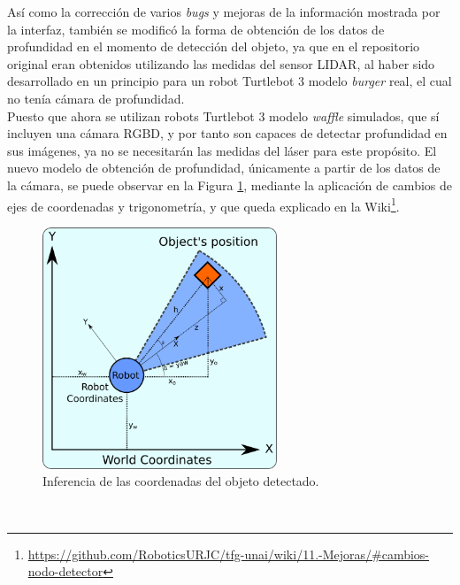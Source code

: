 Así como la corrección de varios \textit{bugs} y mejoras de la información
mostrada por la interfaz, también se modificó la forma de obtención de los datos
de profundidad en el momento de detección del objeto, ya que en el repositorio
original eran obtenidos utilizando las medidas del sensor LIDAR, al haber sido
desarrollado en un principio para un robot Turtlebot 3 modelo \textit{burger}
real, el cual no tenía cámara de profundidad.
\\

Puesto que ahora se utilizan robots Turtlebot 3 modelo \textit{waffle}
simulados, que sí incluyen una cámara RGBD, y por tanto son capaces de detectar
profundidad en sus imágenes, ya no se necesitarán las medidas del láser para
este propósito.
El nuevo modelo de obtención de profundidad, únicamente a partir de los datos de
la cámara, se puede observar en la Figura \ref{fig:coords_infer}, mediante la
aplicación de cambios de ejes de coordenadas y trigonometría, y que queda
explicado en la Wiki\footnote{
\href{https://github.com/RoboticsURJC/tfg-unai/wiki/11.-Mejoras-y-correcciones-del-swarm\_obj\_finder-\%5B30-Sep-\%E2\%80\%90-9-Nov\%5D\#cambios-del-nodo-detector-de-objetos}{https://github.com/RoboticsURJC/tfg-unai/wiki/11.-Mejoras/\#cambios-nodo-detector}}.
\\

\begin{figure} [h!]
  \begin{center}
    \includegraphics[width=7cm]{figs/coordinates_scheme}
  \end{center}
  \caption{Inferencia de las coordenadas del objeto detectado.}
  \label{fig:coords_infer}
\end{figure}\

